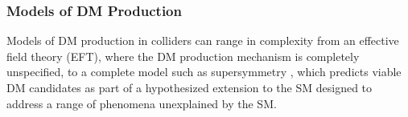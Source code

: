 \subsubsection{Models of DM Production}

Models of DM production in colliders can range in complexity from an effective field theory (EFT), where the DM production mechanism is completely unspecified, to a complete model such as supersymmetry \cite{susy_dm}, which predicts viable DM candidates as part of a hypothesized extension to the SM designed to address a range of phenomena unexplained by the SM. 


